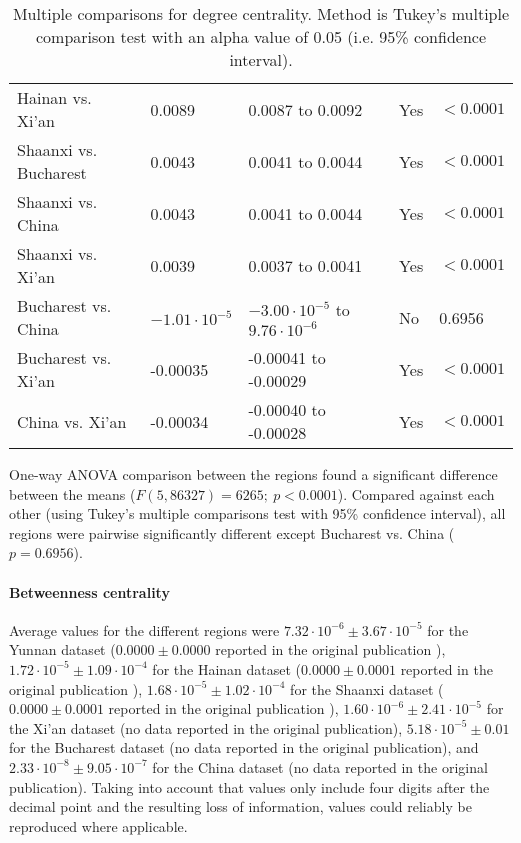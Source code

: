 \begin{table}[htbp]
\begin{mdframed}
\begin{tabular*}{\linewidth}{l|llll}
			Hainan vs. Xi'an & 0.0089 & 0.0087 to 0.0092 & Yes & $<0.0001$\\
			Shaanxi vs. Bucharest & 0.0043 & 0.0041 to 0.0044 & Yes & $<0.0001$\\
			Shaanxi vs. China & 0.0043 & 0.0041 to 0.0044 & Yes & $<0.0001$\\
			Shaanxi vs. Xi'an & 0.0039 & 0.0037 to 0.0041 & Yes & $<0.0001$\\
			Bucharest vs. China & $-1.01\cdot 10^{-5}$ & $-3.00\cdot 10^{-5}$ to $9.76\cdot 10^{-6}$ & No & 0.6956\\
			Bucharest vs. Xi'an & -0.00035 & -0.00041 to -0.00029 & Yes & $<0.0001$\\
			China vs. Xi'an & -0.00034 & -0.00040 to -0.00028 & Yes & $<0.0001$\\
			\hline
		\end{tabular*}
		\caption{Multiple comparisons for degree centrality. Method is Tukey's multiple comparison test with an alpha value of 0.05 (i.e. 95\% confidence interval).}
		\label{tab:degree_centrality_tukey}
	\end{mdframed}
\end{table}

One-way ANOVA comparison between the regions found a significant difference between the means ($F(5,86327) = 6265; \: p<0.0001$). Compared against each other (using Tukey's multiple comparisons test with 95\% confidence interval), all regions were pairwise significantly different except Bucharest vs. China ($p=0.6956$).

\paragraph{Betweenness centrality} Average values for the different regions were $7.32\cdot 10^{-6}\pm3.67\cdot 10^{-5}$ for the Yunnan dataset ($0.0000\pm0.0000$ reported in the original publication \cite{hainan_publication}), $1.72\cdot 10^{-5}\pm1.09\cdot 10^{-4}$ for the Hainan dataset ($0.0000\pm0.0001$ reported in the original publication \cite{hainan_publication}), $1.68\cdot 10^{-5}\pm1.02\cdot 10^{-4}$ for the Shaanxi dataset ($0.0000\pm0.0001$ reported in the original publication \cite{shaanxi_publication}), $1.60\cdot 10^{-6}\pm2.41\cdot 10^{-5}$ for the Xi'an dataset (no data reported in the original publication), $5.18\cdot 10^{-5}\pm0.01$ for the Bucharest dataset (no data reported in the original publication), and $2.33\cdot 10^{-8}\pm9.05\cdot 10^{-7}$ for the China dataset (no data reported in the original publication). Taking into account that values only include four digits after the decimal point and the resulting loss of information, values could reliably be reproduced where applicable.

